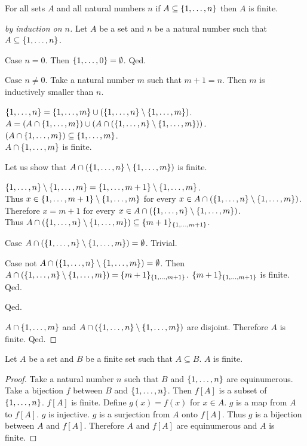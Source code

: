 \documentclass{article}
\begin{document}
\begin{forthel}
	
\begin{lemma}
	For all sets $A$ and all natural numbers $n$ if $A \subseteq \{1,\dots,n\}$ then $A$ is finite.
\end{lemma}

\begin{proof}[by induction on $n$]
	Let $A$ be a set and $n$ be a natural number such that $A \subseteq \{1,\dots,n\}$.
	
	Case $n=0$. Then $\{1,\dots,0\} = \emptyset$. Qed.
	
	Case $n \neq 0$. Take a natural number $m$ such that $m+1=n$. 
	Then $m$ is inductively smaller than $n$. 
	
	$\{1,\dots,n\} = \{1,\dots,m\} \cup (\{1,\dots,n\} \setminus \{1,\dots,m\})$.\\
	$A = (A \cap \{1,\dots,m\}) \cup (A\cap (\{1,\dots,n\} \setminus \{1,\dots,m\}))$.\\
	$(A \cap \{1,\dots,m\}) \subseteq \{1,\dots,m\}$.\\
	$A \cap \{1,\dots,m\}$ is finite.
	
	Let us show that $A\cap (\{1,\dots,n\} \setminus \{1,\dots,m\})$ is finite.
	
	$\{1,\dots,n\} \setminus \{1,\dots,m\} = \{1,\dots,m+1\} \setminus \{1,\dots,m\}$.\\
	Thus $x \in \{1,\dots,m+1\} \setminus \{1,\dots,m\}$ for every $x \in A\cap (\{1,\dots,n\} \setminus \{1,\dots,m\})$.\\
	Therefore $x = m+1$ for every $x \in A\cap (\{1,\dots,n\} \setminus \{1,\dots,m\})$.\\
	Thus $A\cap (\{1,\dots,n\} \setminus \{1,\dots,m\}) \subseteq \{m+1\}_{\{1,\dots,m+1\}}$.
	
	Case $A\cap (\{1,\dots,n\} \setminus \{1,\dots,m\}) = \emptyset$. Trivial.
	
	Case not $A\cap (\{1,\dots,n\} \setminus \{1,\dots,m\}) = \emptyset$.
	Then $A\cap (\{1,\dots,n\} \setminus \{1,\dots,m\}) = \{m+1\}_{\{1,\dots,m+1\}}$.
	$\{m+1\}_{\{1,\dots,m+1\}}$ is finite.
	Qed.
	
	Qed.
	
	$A \cap \{1,\dots,m\}$ and $A\cap (\{1,\dots,n\} \setminus \{1,\dots,m\})$ are disjoint.
	Therefore $A$ is finite.
	Qed.
\end{proof}

\begin{lemma}
	Let $A$ be a set and $B$ be a finite set such that $A \subseteq B$.
	$A$ is finite.
\end{lemma}
\begin{proof}
	Take a natural number $n$ such that $B$ and $\{1,\dots,n\}$ are equinumerous.
	Take a bijection $f$ between $B$ and $\{1,\dots,n\}$.
	Then $f[A]$ is a subset of $\{1,\dots,n\}$.
	$f[A]$ is finite.
	Define $g(x) = f(x)$ for $x\in A$.
	$g$ is a map from $A$ to $f[A]$.
	$g$ is injective.
	$g$ is a surjection from $A$ onto $f[A]$.
	Thus $g$ is a bijection between $A$ and $f[A]$.
	Therefore $A$ and $f[A]$ are equinumerous and $A$ is finite.
\end{proof}


\end{forthel}
\end{document}
